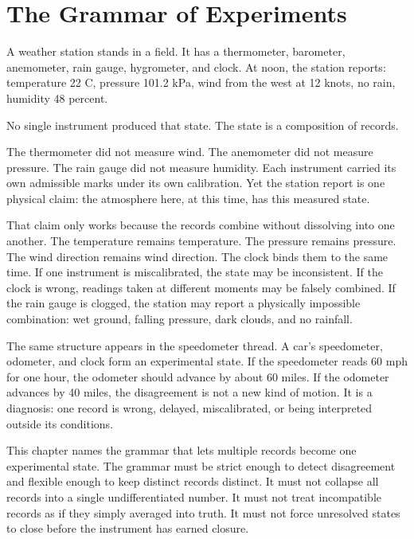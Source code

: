 \chapter{The Grammar of Experiments}
\label{chap:the-grammar-of-experiments}


\begin{chapteressay}

A weather station stands in a field. It has a thermometer, barometer,
anemometer, rain gauge, hygrometer, and clock. At noon, the station reports:
temperature 22 C, pressure 101.2 kPa, wind from the west at 12 knots, no rain,
humidity 48 percent.

No single instrument produced that state. The state is a composition of records.

The thermometer did not measure wind. The anemometer did not measure pressure.
The rain gauge did not measure humidity. Each instrument carried its own
admissible marks under its own calibration. Yet the station report is one
physical claim: the atmosphere here, at this time, has this measured state.

That claim only works because the records combine without dissolving into one
another. The temperature remains temperature. The pressure remains pressure.
The wind direction remains wind direction. The clock binds them to the same
time. If one instrument is miscalibrated, the state may be inconsistent. If the
clock is wrong, readings taken at different moments may be falsely combined. If
the rain gauge is clogged, the station may report a physically impossible
combination: wet ground, falling pressure, dark clouds, and no rainfall.

The same structure appears in the speedometer thread. A car's speedometer,
odometer, and clock form an experimental state. If the speedometer reads 60 mph
for one hour, the odometer should advance by about 60 miles. If the odometer
advances by 40 miles, the disagreement is not a new kind of motion. It is a
diagnosis: one record is wrong, delayed, miscalibrated, or being interpreted
outside its conditions.

This chapter names the grammar that lets multiple records become one
experimental state. The grammar must be strict enough to detect disagreement
and flexible enough to keep distinct records distinct. It must not collapse all
records into a single undifferentiated number. It must not treat incompatible
records as if they simply averaged into truth. It must not force unresolved
states to close before the instrument has earned closure.


\end{chapteressay}
